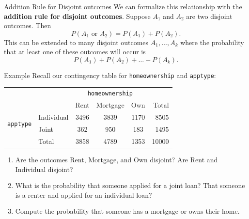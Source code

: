\begin{frame}{Addition Rule for Disjoint outcomes}
    We can formalize this relationship with the \textbf{addition rule for disjoint outcomes}. Suppose $A_1$ and $A_2$ are two disjoint outcomes. Then
    \[
        P(A_1 \text{ or } A_2) = P(A_1)+P(A_2).
    \]
    This can be extended to many disjoint outcomes $A_1, \dots, A_k$ where the probability that at least one of these outcomes will occur is
    \[
        P(A_1)+P(A_2)+\dots+P(A_k).
    \]
\end{frame}

\begin{frame}{Example}
    Recall our contingency table for \texttt{homeownership} and \texttt{apptype}: 
    \begin{center}
        \begin{tabular}{r l ccc r}
		& & \multicolumn{3}{c}{{\texttt{homeownership}}} & \\
        \cline{3-5}
		& & Rent & Mortgage & Own & Total  \\ 
        \cline{2-6}
        \multirow{2}{*}{{\texttt{apptype}}} 
        & Individual & 3496 & 3839 & 1170 & 8505 \\ 
  		& Joint & 362 & 950 & 183 & 1495 \\ 
        \cline{2-6}
  		& Total	& 3858 & 4789 & 1353 & 10000 \\
        \cline{2-6}
    \end{tabular}
    \end{center}
    \begin{enumerate}
        \item Are the outcomes Rent, Mortgage, and Own disjoint? Are Rent and Individual disjoint?
        \item What is the probability that someone applied for a joint loan? That someone is a renter and applied for an individual loan?
        \item Compute the probability that someone has a mortgage or owns their home.
    \end{enumerate}
\end{frame}

